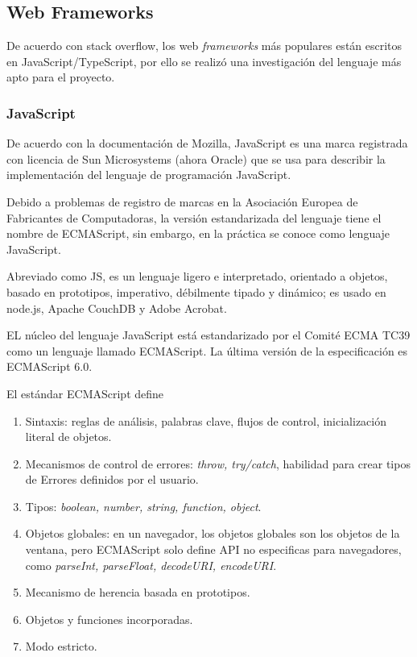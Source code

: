 \subsection{Web Frameworks}

De acuerdo con stack overflow\cite{noauthor_most_nodate}, los web \textit{frameworks} más populares están escritos en JavaScript/TypeScript, por ello se realizó una investigación del lenguaje más apto para el proyecto.

\subsubsection*{JavaScript}
De acuerdo con la documentación de Mozilla\cite{noauthor_javascript_nodate}, JavaScript es una marca registrada con licencia de Sun Microsystems (ahora Oracle) que se usa para describir la implementación del lenguaje de programación JavaScript.


Debido a problemas de registro de marcas en la Asociación Europea de Fabricantes de Computadoras, la versión estandarizada del lenguaje tiene el nombre de ECMAScript, sin embargo, en la práctica se conoce como lenguaje JavaScript. 


Abreviado como JS, es un lenguaje ligero e interpretado, orientado a objetos, basado en prototipos, imperativo, débilmente tipado y dinámico; es usado en node.js, Apache CouchDB y Adobe Acrobat.


EL núcleo del lenguaje JavaScript está estandarizado por el Comité ECMA TC39 como un lenguaje llamado ECMAScript. La última versión de la especificación es ECMAScript 6.0.


El estándar ECMAScript define 

\begin{enumerate}
    \item Sintaxis: reglas de análisis, palabras clave, flujos de control, inicialización literal de objetos.
    \item Mecanismos de control de errores: \textit{throw, try/catch}, habilidad para crear tipos de Errores definidos por el usuario.
    \item Tipos: \textit{boolean, number, string, function, object}.
    \item  Objetos globales: en un navegador, los objetos globales son los objetos de la ventana, pero ECMAScript solo define API no especificas para navegadores, como \textit{parseInt, parseFloat, decodeURI, encodeURI}.
    \item Mecanismo de herencia basada en prototipos.
    \item Objetos y funciones incorporadas.
    \item Modo estricto.
\end{enumerate}

